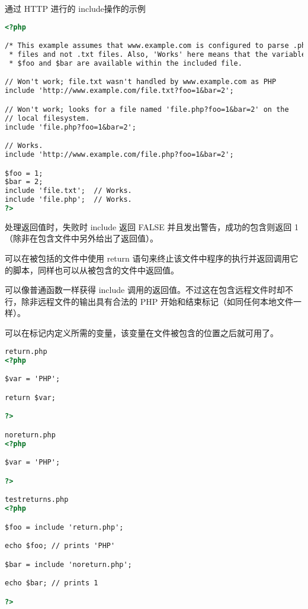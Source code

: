 \begin{example}
通过 HTTP 进行的 include操作的示例
\begin{lstlisting}[language=HTML]
<?php

/* This example assumes that www.example.com is configured to parse .php *
 * files and not .txt files. Also, 'Works' here means that the variables *
 * $foo and $bar are available within the included file.                 */

// Won't work; file.txt wasn't handled by www.example.com as PHP
include 'http://www.example.com/file.txt?foo=1&bar=2';

// Won't work; looks for a file named 'file.php?foo=1&bar=2' on the
// local filesystem.
include 'file.php?foo=1&bar=2';

// Works.
include 'http://www.example.com/file.php?foo=1&bar=2';

$foo = 1;
$bar = 2;
include 'file.txt';  // Works.
include 'file.php';  // Works.
?>
\end{lstlisting}
\end{example}

处理返回值时，失败时 include 返回 FALSE 并且发出警告，成功的包含则返回 1（除非在包含文件中另外给出了返回值）。

\begin{compactitem}
\item 可以在被包括的文件中使用 return 语句来终止该文件中程序的执行并返回调用它的脚本，同样也可以从被包含的文件中返回值。
\item 可以像普通函数一样获得 include 调用的返回值。不过这在包含远程文件时却不行，除非远程文件的输出具有合法的 PHP 开始和结束标记（如同任何本地文件一样）。
\item 可以在标记内定义所需的变量，该变量在文件被包含的位置之后就可用了。
\end{compactitem}



\begin{lstlisting}[language=HTML]
return.php
<?php

$var = 'PHP';

return $var;

?>

noreturn.php
<?php

$var = 'PHP';

?>

testreturns.php
<?php

$foo = include 'return.php';

echo $foo; // prints 'PHP'

$bar = include 'noreturn.php';

echo $bar; // prints 1

?>
\end{lstlisting}


